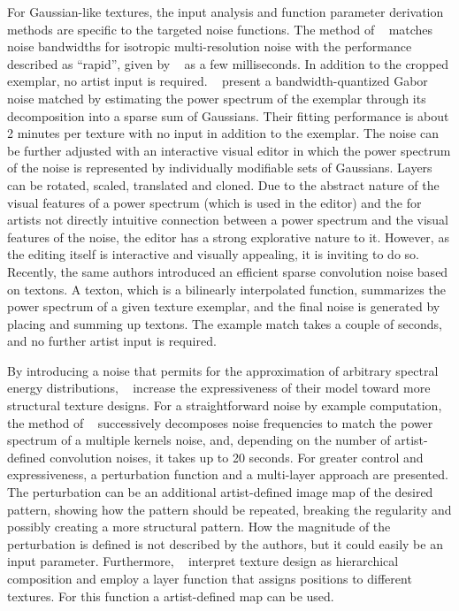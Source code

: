 For Gaussian-like textures, the input analysis and function parameter derivation methods are specific to the targeted noise functions. The method of \citeauthor*{lagae_2010_pis}~\cite{lagae_2010_pis} matches noise bandwidths for isotropic multi-resolution noise with the performance described as ``rapid'', given by \citeauthor*{gilet_2012_mkn}~\cite{gilet_2012_mkn} as a few milliseconds. In addition to the cropped exemplar, no artist input is required. \citeauthor*{galerne_2012_gne}~\cite{galerne_2012_gne} present a bandwidth-quantized Gabor noise matched by estimating the power spectrum of the exemplar through its decomposition into a sparse sum of Gaussians. Their fitting performance is about 2 minutes per texture with no input in addition to the exemplar. The noise can be further adjusted with an interactive visual editor in which the power spectrum of the noise is represented by individually modifiable sets of Gaussians. Layers can be rotated, scaled, translated and cloned. Due to the abstract nature of the visual features of a power spectrum (which is used in the editor) and the for artists not directly intuitive connection between a power spectrum and the visual features of the noise, the editor has a strong explorative nature to it. However, as the editing itself is interactive and visually appealing, it is inviting to do so. 
Recently, the same authors \cite{galerne_2017_tno} introduced an efficient sparse convolution noise based on textons. A texton, which is a bilinearly interpolated function, summarizes the power spectrum of a given texture exemplar, and the final noise is generated by placing and summing up textons. The example match takes a couple of seconds, and no further artist input is required.

By introducing a noise that permits for the approximation of arbitrary spectral energy distributions, \citeauthor*{gilet_2012_mkn}~\cite{gilet_2012_mkn} increase the expressiveness of their model toward more structural texture designs. For a straightforward noise by example computation, the method of \citeauthor*{gilet_2012_mkn}~\cite{gilet_2012_mkn} successively decomposes noise frequencies to match the power spectrum of a multiple kernels noise, and, depending on the number of artist-defined convolution noises, it takes up to 20 seconds. For greater control and expressiveness, a perturbation function and a multi-layer approach are presented. The perturbation can be an additional artist-defined image map of the desired pattern, showing how the pattern should be repeated, breaking the regularity and possibly creating a more structural pattern. How the magnitude of the perturbation is defined is not described by the authors, but it could easily be an input parameter. Furthermore, \citeauthor*{gilet_2012_mkn}~\cite{gilet_2012_mkn} interpret texture design as hierarchical composition and employ a layer function that assigns positions to different textures. For this function a artist-defined map can be used.

